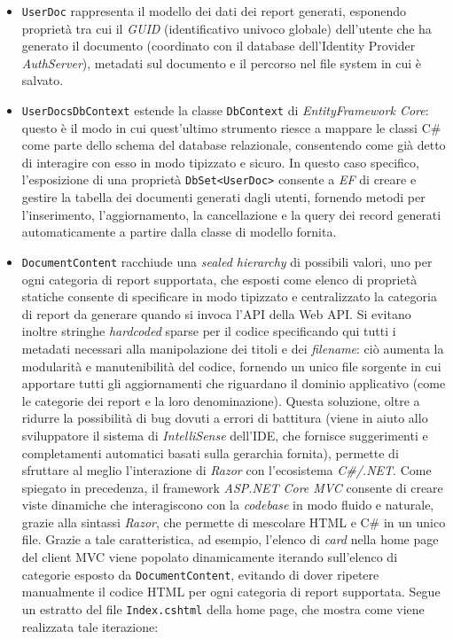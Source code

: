 \begin{itemize}
        \item \texttt{UserDoc} rappresenta il modello dei dati dei report generati, esponendo proprietà tra cui il \emph{GUID} (identificativo univoco globale) dell'utente che ha generato il documento (coordinato con il database dell'Identity Provider \emph{AuthServer}), metadati sul documento e il percorso nel file system in cui è salvato.
        \item \texttt{UserDocsDbContext} estende la classe \texttt{DbContext} di \emph{EntityFramework Core}: questo è il modo in cui quest'ultimo strumento riesce a mappare le classi C\# come parte dello schema del database relazionale, consentendo come già detto di interagire con esso in modo tipizzato e sicuro.
        In questo caso specifico, l'esposizione di una proprietà \texttt{DbSet<UserDoc>} consente a \emph{EF} di creare e gestire la tabella dei documenti generati dagli utenti, fornendo metodi per l'inserimento, l'aggiornamento, la cancellazione e la query dei record generati automaticamente a partire dalla classe di modello fornita.
        \item \texttt{DocumentContent} racchiude una \emph{sealed hierarchy} di possibili valori, uno per ogni categoria di report supportata, che esposti come elenco di proprietà statiche consente di specificare in modo tipizzato e centralizzato la categoria di report da generare quando si invoca l'API della Web API. Si evitano inoltre stringhe \emph{hardcoded} sparse per il codice specificando qui tutti i metadati necessari alla manipolazione dei titoli e dei \emph{filename}: ciò aumenta la modularità e manutenibilità del codice, fornendo un unico file sorgente in cui apportare tutti gli aggiornamenti che riguardano il dominio applicativo (come le categorie dei report e la loro denominazione).
        Questa soluzione, oltre a ridurre la possibilità di bug dovuti a errori di battitura (viene in aiuto allo sviluppatore il sistema di \emph{IntelliSense} dell'IDE, che fornisce suggerimenti e completamenti automatici basati sulla gerarchia fornita), permette di sfruttare al meglio l'interazione di \emph{Razor} con l'ecosistema \emph{C\#/.NET}.
        Come spiegato in precedenza, il framework \emph{ASP.NET Core MVC} consente di creare viste dinamiche che interagiscono con la \emph{codebase} in modo fluido e naturale, grazie alla sintassi \emph{Razor}, che permette di mescolare HTML e C\# in un unico file.
        Grazie a tale caratteristica, ad esempio, l'elenco di \emph{card} nella home page del client MVC viene popolato dinamicamente iterando sull'elenco di categorie esposto da \texttt{DocumentContent}, evitando di dover ripetere manualmente il codice HTML per ogni categoria di report supportata. Segue un estratto del file \texttt{Index.cshtml} della home page, che mostra come viene realizzata tale iterazione:

\end{itemize}
